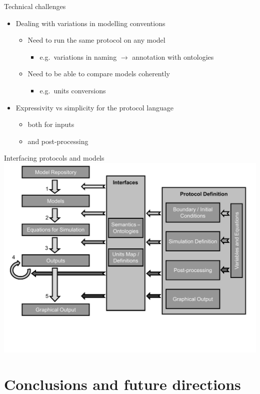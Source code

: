 \documentclass[t,xcolor={usenames,dvipsnames}]{beamer}
\newcommand{\subitem}[1]{\begin{itemize}\item #1 \end{itemize}}
\begin{document}
\begin{frame}{Technical challenges}%
\begin{itemize}
\item Dealing with variations in modelling conventions
  \begin{itemize}
  \item Need to run the same protocol on any model
    \subitem{e.g.\ variations in naming $\rightarrow$ annotation with \alert{ontologies}}
  \item Need to be able to compare models coherently
    \subitem{e.g.\ units conversions}
  \end{itemize}
\item Expressivity vs simplicity for the protocol language
  \begin{itemize}
  \item both for inputs
  \item and post-processing
  \end{itemize}
\end{itemize}
\end{frame}

\begin{frame}{Interfacing protocols and models}
\includegraphics[width=.9\textwidth]{schematic_v4}
\end{frame}

\section{Conclusions and future directions}
\end{document}
